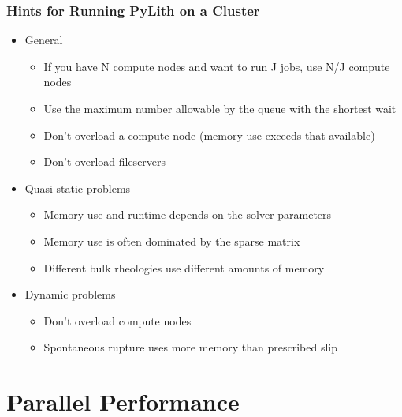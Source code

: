 \documentclass{beamer}
\begin{document}
\begin{frame}
  \frametitle{Hints for Running PyLith on a Cluster}

  \begin{itemize}
  \item General
    \begin{itemize}
    \item If you have N compute nodes and want to run J jobs, use N/J
      compute nodes
    \item Use the maximum number allowable by the queue with the
      shortest wait
    \item Don't overload a compute node (memory use exceeds that
      available)
    \item Don't overload fileservers
    \end{itemize}
  \item Quasi-static problems
    \begin{itemize}
    \item Memory use and runtime depends on the solver parameters
    \item Memory use is often dominated by the sparse matrix
    \item Different bulk rheologies use different amounts of memory
    \end{itemize}
  \item Dynamic problems
    \begin{itemize}
    \item Don't overload compute nodes
    \item Spontaneous rupture uses more memory than prescribed slip
    \end{itemize}
  \end{itemize}

\end{frame}


\section{Parallel Performance}
\subsection{}
\end{document}

